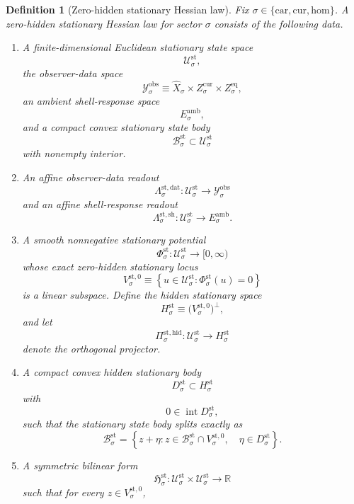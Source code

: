 \documentclass[11pt]{article}
\newcommand{\Car}{\mathrm{car}}
\newcommand{\Cur}{\mathrm{cur}}
\newcommand{\Hom}{\mathrm{hom}}
\newcommand{\VisibleAffine}[1]{\widehat X_{#1}}
\newcommand{\DataSpace}[1]{\mathcal Y_{#1}^{\mathrm{obs}}}
\newcommand{\AmbientTarget}[1]{E_{#1}^{\mathrm{amb}}}
\newcommand{\StatSpace}[1]{\mathcal U_{#1}^{\mathrm{st}}}
\newcommand{\StatBody}[1]{\mathcal B_{#1}^{\mathrm{st}}}
\newcommand{\StatData}[1]{\Lambda_{#1}^{\mathrm{st,dat}}}
\newcommand{\StatShell}[1]{\Lambda_{#1}^{\mathrm{st,sh}}}
\newcommand{\StatPotential}[1]{\Phi_{#1}^{\mathrm{st}}}
\newcommand{\StatZero}[1]{V_{#1}^{\mathrm{st},0}}
\newcommand{\StatHidden}[1]{H_{#1}^{\mathrm{st}}}
\newcommand{\StatHiddenBody}[1]{D_{#1}^{\mathrm{st}}}
\newcommand{\StatProj}[1]{\Pi_{#1}^{\mathrm{st,hid}}}
\newcommand{\StatHess}[1]{\mathfrak H_{#1}^{\mathrm{st}}}
\newtheorem{definition}{Definition}
\begin{document}
\begin{definition}[Zero-hidden stationary Hessian law]
\label{def:stationary}
Fix \(\sigma\in\{\Car,\Cur,\Hom\}\). A \emph{zero-hidden stationary Hessian law} for sector \(\sigma\) consists of the following data.
\begin{enumerate}
    \item A finite-dimensional Euclidean stationary state space
    \[
    \StatSpace{\sigma},
    \]
    the observer-data space
    \[
    \DataSpace{\sigma}
    \equiv
    \VisibleAffine{\sigma}\times Z_{\sigma}^{\mathrm{cur}}\times Z_{\sigma}^{\mathrm{eq}},
    \]
    an ambient shell-response space
    \[
    \AmbientTarget{\sigma},
    \]
    and a compact convex stationary state body
    \[
    \StatBody{\sigma}\subset\StatSpace{\sigma}
    \]
    with nonempty interior.
    \item An affine observer-data readout
    \[
    \StatData{\sigma}:\StatSpace{\sigma}\to\DataSpace{\sigma}
    \]
    and an affine shell-response readout
    \[
    \StatShell{\sigma}:\StatSpace{\sigma}\to\AmbientTarget{\sigma}.
    \]
    \item A smooth nonnegative stationary potential
    \[
    \StatPotential{\sigma}:\StatSpace{\sigma}\to[0,\infty)
    \]
    whose exact zero-hidden stationary locus
    \[
    \StatZero{\sigma}
    \equiv
    \left\{
    u\in\StatSpace{\sigma}:
    \StatPotential{\sigma}(u)=0
    \right\}
    \]
    is a linear subspace. Define the hidden stationary space
    \[
    \StatHidden{\sigma}
    \equiv
    \bigl(\StatZero{\sigma}\bigr)^{\perp},
    \]
    and let
    \[
    \StatProj{\sigma}:\StatSpace{\sigma}\to\StatHidden{\sigma}
    \]
    denote the orthogonal projector.
    \item A compact convex hidden stationary body
    \[
    \StatHiddenBody{\sigma}\subset\StatHidden{\sigma}
    \]
    with
    \[
    0\in\operatorname{int}\StatHiddenBody{\sigma},
    \]
    such that the stationary state body splits exactly as
    \begin{equation}
    \StatBody{\sigma}
    =
    \left\{
    z+\eta:
    z\in\StatBody{\sigma}\cap\StatZero{\sigma},
    \quad
    \eta\in\StatHiddenBody{\sigma}
    \right\}.
    \label{eq:statsplitting}
    \end{equation}
    \item A symmetric bilinear form
    \[
    \StatHess{\sigma}:
    \StatSpace{\sigma}\times\StatSpace{\sigma}\to\mathbb R
    \]
    such that for every \(z\in\StatZero{\sigma}\),
    \begin{equation}

\end{equation}
\end{enumerate}
\end{definition}
\end{document}
